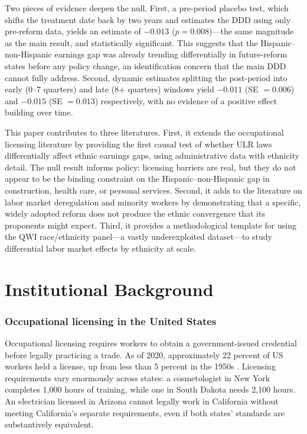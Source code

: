\documentclass[12pt]{article}
\begin{document}
Two pieces of evidence deepen the null. First, a pre-period placebo test, which shifts the treatment date back by two years and estimates the DDD using only pre-reform data, yields an estimate of $-0.013$ ($p = 0.008$)---the same magnitude as the main result, and statistically significant. This suggests that the Hispanic--non-Hispanic earnings gap was already trending differentially in future-reform states before any policy change, an identification concern that the main DDD cannot fully address. Second, dynamic estimates splitting the post-period into early (0--7 quarters) and late (8+ quarters) windows yield $-0.011$ (SE $= 0.006$) and $-0.015$ (SE $= 0.013$) respectively, with no evidence of a positive effect building over time.

This paper contributes to three literatures. First, it extends the occupational licensing literature \citep{kleiner2013analyzing, gittleman2018analyzing, blair2019barrier, johnson2020licensing} by providing the first causal test of whether ULR laws differentially affect ethnic earnings gaps, using administrative data with ethnicity detail. The null result informs policy: licensing barriers are real, but they do not appear to be the binding constraint on the Hispanic--non-Hispanic gap in construction, health care, or personal services. Second, it adds to the literature on labor market deregulation and minority workers \citep{law2009effects, oflaherty2019occupational, bae2025earnings} by demonstrating that a specific, widely adopted reform does not produce the ethnic convergence that its proponents might expect. Third, it provides a methodological template for using the QWI race/ethnicity panel---a vastly underexploited dataset---to study differential labor market effects by ethnicity at scale.

\section{Institutional Background}

\subsubsection*{Occupational licensing in the United States} Occupational licensing requires workers to obtain a government-issued credential before legally practicing a trade. As of 2020, approximately 22 percent of US workers held a license, up from less than 5 percent in the 1950s \citep{kleiner2015guild}. Licensing requirements vary enormously across states: a cosmetologist in New York completes 1,000 hours of training, while one in South Dakota needs 2,100 hours. An electrician licensed in Arizona cannot legally work in California without meeting California's separate requirements, even if both states' standards are substantively equivalent.
\end{document}
